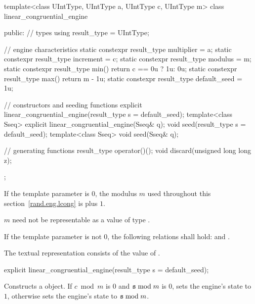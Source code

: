 \begin{codeblock}
template<class UIntType, UIntType a, UIntType c, UIntType m>
 class linear_congruential_engine
{
public:
 // types
 using result_type = UIntType;

 // engine characteristics
 static constexpr result_type multiplier = a;
 static constexpr result_type increment = c;
 static constexpr result_type modulus = m;
 static constexpr result_type min() { return c == 0u ? 1u: 0u; }
 static constexpr result_type max() { return m - 1u; }
 static constexpr result_type default_seed = 1u;

 // constructors and seeding functions
 explicit linear_congruential_engine(result_type s = default_seed);
 template<class Sseq> explicit linear_congruential_engine(Sseq& q);
 void seed(result_type s = default_seed);
 template<class Sseq> void seed(Sseq& q);

 // generating functions
 result_type operator()();
 void discard(unsigned long long z);
};
\end{codeblock}

\pnum
If the template parameter
 is $0$,
the modulus $m$
used throughout this section~\ref{rand.eng.lcong}
is  plus $1$.
\begin{note}
 $m$ need not be representable
 as a value of type .
\end{note}

\pnum
If the template parameter
 is not $0$,
the following relations shall hold:
and
  .

\pnum The textual representation%
consists of
the value of .

%

\begin{itemdecl}
explicit linear_congruential_engine(result_type s = default_seed);
\end{itemdecl}

\begin{itemdescr}
\pnum\effects Constructs a  object.
 If $ c \bmod m $ is $0$ and $ \texttt{s} \bmod m $ is $0$,
 sets the engine's state to $1$,
 otherwise sets the engine's state to $\texttt{s} \bmod m$.
\end{itemdescr}

